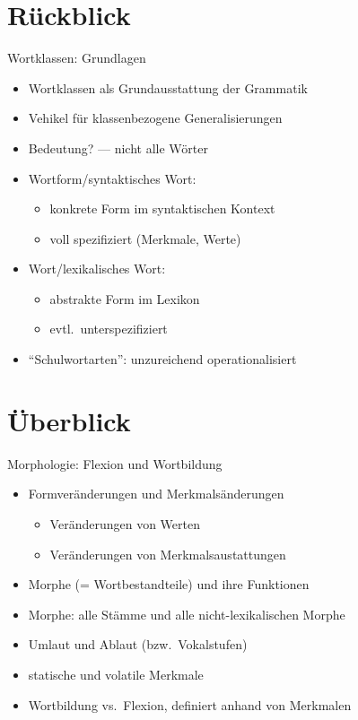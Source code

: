 
\section{Rückblick}

\begin{frame}
  {Wortklassen: Grundlagen}
  \pause
  \begin{itemize}[<+->]
    \item Wortklassen als \alert{Grundausstattung der Grammatik}
    \item Vehikel für klassenbezogene Generalisierungen
    \item Bedeutung? --- nicht alle Wörter
      \Zeile
    \item Wortform\slash syntaktisches Wort:
      \begin{itemize}[<+->]
        \item konkrete Form \alert{im syntaktischen Kontext}
        \item voll spezifiziert (Merkmale, Werte)
      \end{itemize}
      \Zeile
    \item Wort\slash lexikalisches Wort:
      \begin{itemize}[<+->]
        \item abstrakte Form \alert{im Lexikon}
        \item evtl.\ unterspezifiziert
      \end{itemize}
      \Zeile
    \item "`Schulwortarten"': \alert{unzureichend operationalisiert}
  \end{itemize}
\end{frame}

\section{Überblick}

\begin{frame}
  {Morphologie: Flexion und Wortbildung}
  \pause
  \begin{itemize}[<+->]
    \item \alert{Formveränderungen} und \alert{Merkmalsänderungen}
      \begin{itemize}[<+->]
        \item Veränderungen von Werten
        \item Veränderungen von Merkmalsaustattungen
      \end{itemize}
      \Halbzeile
    \item Morphe (= Wortbestandteile) und ihre Funktionen
    \item Morphe: alle Stämme und alle nicht-lexikalischen Morphe
    \item Umlaut und Ablaut (bzw.\ Vokalstufen)
      \Halbzeile
    \item statische und volatile Merkmale
    \item Wortbildung vs.\ Flexion, definiert anhand von Merkmalen
  \end{itemize}
\end{frame}

